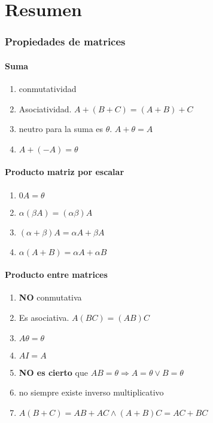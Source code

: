 \documentclass[]{article}
\begin{document}
\part{Resumen}



\section{Propiedades de matrices}

\subsection{Suma}
\begin{enumerate}
	\item conmutatividad
	\item Asociatividad. $A+(B+C)=(A+B)+C$
	\item neutro para la suma es $\theta$. $A+ \theta =A$
	\item $A+(-A)= \theta$
\end{enumerate}



\subsection{Producto matriz por escalar}
\begin{enumerate}
	\item $0A=\theta$
	\item $\alpha (\beta A) = (\alpha \beta)A$
	\item $(\alpha + \beta)A= \alpha A + \beta A$
	\item $\alpha (A+B)= \alpha A + \alpha B$
\end{enumerate}



\subsection{Producto entre matrices}
\begin{enumerate}
	\item \textbf{NO} conmutativa
	\item Es asociativa. $A(BC)=(AB)C$
	\item $A\theta = \theta$
	\item $AI=A$
	\item \textbf{NO es cierto} que $AB=\theta \Longrightarrow A=\theta \vee B=\theta$
	\item no siempre existe inverso multiplicativo
	\item $A(B+C) = AB+AC \wedge  (A+B)C=AC+BC$
\end{enumerate}
\end{document}
